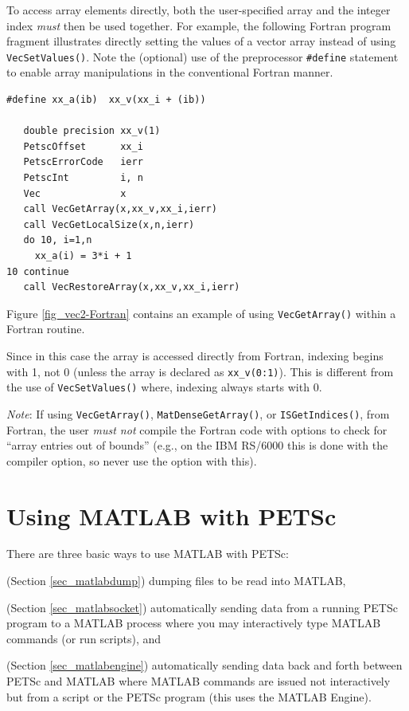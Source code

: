 To access array elements directly, both the user-specified array and
the integer index {\em must} then be used together.
For example, the following Fortran program fragment illustrates
directly setting the values of a vector array instead of using \lstinline{VecSetValues()}.  Note the (optional) use of the preprocessor
\lstinline{#define} statement to enable array manipulations in the conventional
Fortran manner.
\begin{lstlisting}
#define xx_a(ib)  xx_v(xx_i + (ib))

   double precision xx_v(1)
   PetscOffset      xx_i
   PetscErrorCode   ierr
   PetscInt         i, n
   Vec              x
   call VecGetArray(x,xx_v,xx_i,ierr)
   call VecGetLocalSize(x,n,ierr)
   do 10, i=1,n
     xx_a(i) = 3*i + 1
10 continue
   call VecRestoreArray(x,xx_v,xx_i,ierr)
\end{lstlisting}
Figure \ref{fig_vec2-Fortran} contains an example of using \lstinline{VecGetArray()}
within a Fortran routine.

Since in this case the array is accessed directly from Fortran,
indexing begins with 1, not 0 (unless the array is declared as \lstinline{xx_v(0:1)}).
This is different from the use of \lstinline{VecSetValues()}
where, indexing always starts with 0.

{\em Note}: If using \lstinline{VecGetArray()}, \lstinline{MatDenseGetArray()}, or \lstinline{ISGetIndices()},
from Fortran, the user {\em must not} compile the Fortran code with options
to check for ``array entries out of bounds'' (e.g., on the IBM RS/6000 this
is done with the  compiler option, so never use the  option with this).


\cleardoublepage
\chapter{Using MATLAB with PETSc}
\label{ch_matlab}

There are three basic ways to use MATLAB with PETSc: 
\begin{tightenumerate}
  \item (Section \ref{sec_matlabdump}) dumping files to be read into MATLAB,
  \item (Section \ref{sec_matlabsocket}) automatically sending data from a running PETSc program
to a MATLAB process where you may interactively type MATLAB commands (or run
scripts), and 
\item (Section \ref{sec_matlabengine}) automatically sending data back and forth between PETSc and
MATLAB where MATLAB commands are issued not interactively but from a script or
the PETSc program (this uses the MATLAB Engine).
\end{tightenumerate}

